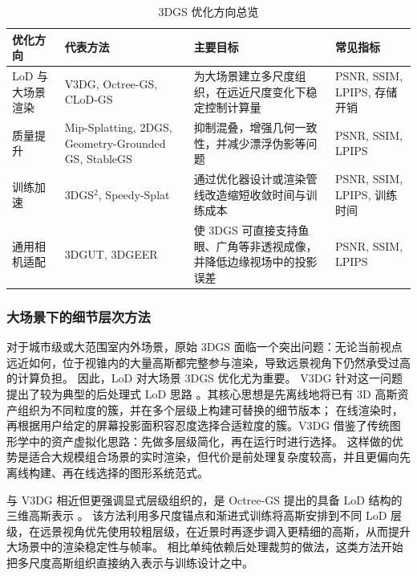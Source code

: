 \begin{table}[htbp]
    \centering
    \caption{3DGS 优化方向总览}
    \label{tab:gs-overview}
    \footnotesize
    \setlength{\tabcolsep}{3pt}
    \begin{tabular}{>{\raggedright\arraybackslash}p{2.1cm}>{\raggedright\arraybackslash}p{4.2cm}>{\raggedright\arraybackslash}p{5.2cm}>{\raggedright\arraybackslash}p{2.0cm}}
        \toprule
        优化方向 & 代表方法 & 主要目标 & 常见指标 \\
        \midrule
        LoD 与大场景渲染 & V3DG, Octree-GS, CLoD-GS & 为大场景建立多尺度组织，在远近尺度变化下稳定控制计算量 & PSNR, SSIM, LPIPS, 存储开销 \\
        质量提升 & Mip-Splatting, 2DGS, Geometry-Grounded GS, StableGS & 抑制混叠，增强几何一致性，并减少漂浮伪影等问题 & PSNR, SSIM, LPIPS \\
        训练加速 & 3DGS$^2$, Speedy-Splat & 通过优化器设计或渲染管线改造缩短收敛时间与训练成本 & PSNR, SSIM, LPIPS, 训练时间 \\
        通用相机适配 & 3DGUT, 3DGEER & 使 3DGS 可直接支持鱼眼、广角等非透视成像，并降低边缘视场中的投影误差 & PSNR, SSIM, LPIPS \\
        \bottomrule
    \end{tabular}
\end{table}

\subsubsection{大场景下的细节层次方法}

对于城市级或大范围室内外场景，原始 3DGS 面临一个突出问题：无论当前视点远近如何，位于视锥内的大量高斯都完整参与渲染，导致远景视角下仍然承受过高的计算负担。
因此，LoD 对大场景 3DGS 优化尤为重要。
V3DG 针对这一问题提出了较为典型的后处理式 LoD 思路 \cite{yang2025v3dg}。其核心思想是先离线地将已有 3D 高斯资产组织为不同粒度的簇，并在多个层级上构建可替换的细节版本；
在线渲染时，再根据用户给定的屏幕投影面积容忍度选择合适粒度的簇。V3DG 借鉴了传统图形学中的资产虚拟化思路：先做多层级简化，再在运行时进行选择。
这样做的优势是适合大规模组合场景的实时渲染，但代价是前处理复杂度较高，并且更偏向先离线构建、再在线选择的图形系统范式。

与 V3DG 相近但更强调显式层级组织的，是 Octree-GS 提出的具备 LoD 结构的三维高斯表示 \cite{ren2024octree}。
该方法利用多尺度锚点和渐进式训练将高斯安排到不同 LoD 层级，在远景视角优先使用较粗层级，在近景时再逐步调入更精细的高斯，从而提升大场景中的渲染稳定性与帧率。
相比单纯依赖后处理裁剪的做法，这类方法开始把多尺度高斯组织直接纳入表示与训练设计之中。

